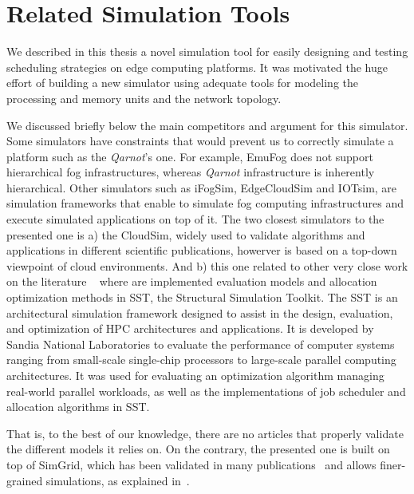 \section{Related Simulation Tools}

We described in this thesis a novel simulation tool for easily designing and testing scheduling strategies on edge computing platforms.
It was motivated the huge effort of building a new simulator using adequate tools for modeling the processing and memory units and the network topology.

We discussed briefly below the main competitors and argument for this simulator. 
Some simulators have constraints that would prevent us to correctly simulate a platform such as the \emph{Qarnot}'s one.
For example, EmuFog\cite{emufog} does not support hierarchical fog infrastructures, whereas \emph{Qarnot} infrastructure is inherently hierarchical. 
Other simulators such as iFogSim\cite{ifogsim},  EdgeCloudSim\cite{edgecloudsim} and IOTsim\cite{iotsim}, are simulation frameworks that enable to simulate fog computing infrastructures and execute simulated applications on top of it.
The two closest simulators to the presented one is a) the CloudSim, widely used to validate algorithms and applications in different scientific publications, howerver is based on a top-down viewpoint of cloud environments. 
And b) this one related to other very close work on the literature ~\cite{simulation_optimization} where are implemented evaluation models and allocation optimization methods in SST, the Structural Simulation Toolkit. The SST is an architectural simulation framework designed to assist in the design, evaluation, and optimization of HPC architectures and applications. It is developed by Sandia National Laboratories to evaluate the performance of computer systems ranging from small-scale single-chip processors to large-scale parallel computing architectures. It was used for evaluating an optimization algorithm managing real-world parallel workloads, as well as the implementations of job scheduler and allocation algorithms in SST.

That is, to the best of our knowledge, there are no articles that properly validate the different models it relies on. 
On the contrary, the presented one is built on top of SimGrid, which has been validated in many publications~\cite{simgrid_publis} and allows finer-grained simulations, as explained in~.